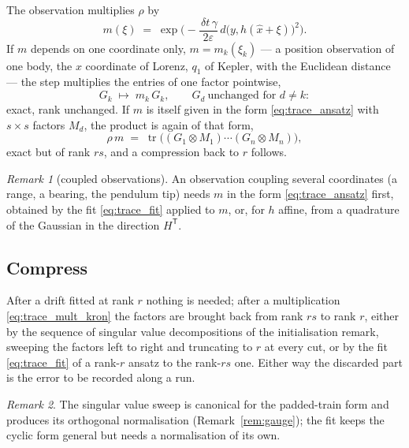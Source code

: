 \documentclass[11pt,a4paper]{article}
\newcommand{\tr}{\operatorname{tr}}
\newcommand{\T}{^{\mathsf T}}
\newcommand{\xh}{\hat{x}}
\newcommand{\eps}{\varepsilon}
\newcommand{\dt}{\,\delta t}
\theoremstyle{plain}
\theoremstyle{definition}
\theoremstyle{remark}
\newtheorem{remark}{Remark}
\begin{document}
The observation multiplies $\rho$ by
\begin{equation}
  m(\xi) \;=\; \exp\Big(-\frac{\dt\,\gamma}{2\eps}\,d\big(y,h(\xh+\xi)\big)^2\Big).
  \label{eq:trace_m}
\end{equation}
If $m$ depends on one coordinate only, $m=m_k(\xi_k)$ --- a position observation of one body, the $x$ coordinate of Lorenz, $q_1$ of Kepler, with the Euclidean distance --- the step multiplies the entries of one factor pointwise,
\begin{equation}
  G_k \;\mapsto\; m_k\,G_k, \qquad G_d\ \text{unchanged for } d\ne k :
  \label{eq:trace_mult_1}
\end{equation}
exact, rank unchanged. If $m$ is itself given in the form \eqref{eq:trace_ansatz} with $s\times s$ factors $M_d$, the product is again of that form,
\begin{equation}
  \rho\,m \;=\; \tr\big((G_1\otimes M_1)\cdots(G_n\otimes M_n)\big),
  \label{eq:trace_mult_kron}
\end{equation}
exact but of rank $rs$, and a compression back to $r$ follows.

\begin{remark}[coupled observations]
An observation coupling several coordinates (a range, a bearing, the pendulum tip) needs $m$ in the form \eqref{eq:trace_ansatz} first, obtained by the fit \eqref{eq:trace_fit} applied to $m$, or, for $h$ affine, from a quadrature of the Gaussian in the direction $H\T$.
\end{remark}

\subsection{Compress}

After a drift fitted at rank $r$ nothing is needed; after a multiplication \eqref{eq:trace_mult_kron} the factors are brought back from rank $rs$ to rank $r$, either by the sequence of singular value decompositions of the initialisation remark, sweeping the factors left to right and truncating to $r$ at every cut, or by the fit \eqref{eq:trace_fit} of a rank-$r$ ansatz to the rank-$rs$ one. Either way the discarded part is the error to be recorded along a run.

\begin{remark}
The singular value sweep is canonical for the padded-train form and produces its orthogonal normalisation (Remark~\ref{rem:gauge}); the fit keeps the cyclic form general but needs a normalisation of its own.
\end{remark}
\end{document}
